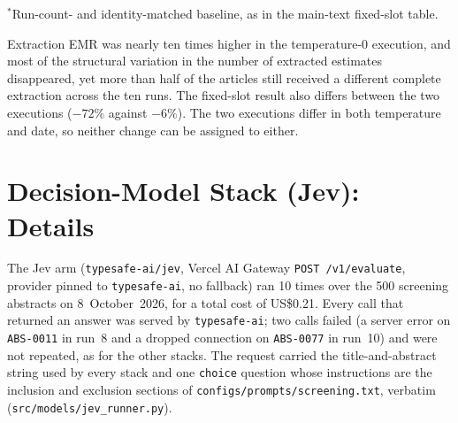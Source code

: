 \documentclass[11pt]{article}
\begin{document}
\noindent $^{*}$Run-count- and identity-matched baseline, as in the main-text fixed-slot table.

\noindent Extraction EMR was nearly ten times higher in the temperature-0 execution, and most of the structural variation in the number of extracted estimates disappeared, yet more than half of the articles still received a different complete extraction across the ten runs. The fixed-slot result also differs between the two executions ($-72\%$ against $-6\%$). The two executions differ in both temperature and date, so neither change can be assigned to either.

\section{Decision-Model Stack (Jev): Details}
\label{sec:jev_supp}

The Jev arm (\texttt{typesafe-ai/jev}, Vercel AI Gateway \texttt{POST /v1/evaluate}, provider pinned to \texttt{typesafe-ai}, no fallback) ran 10 times over the 500 screening abstracts on 8~October~2026, for a total cost of US\$0.21. Every call that returned an answer was served by \texttt{typesafe-ai}; two calls failed (a server error on \texttt{ABS-0011} in run~8 and a dropped connection on \texttt{ABS-0077} in run~10) and were not repeated, as for the other stacks. The request carried the title-and-abstract string used by every stack and one \texttt{choice} question whose instructions are the inclusion and exclusion sections of \texttt{configs/prompts/screening.txt}, verbatim (\texttt{src/models/jev\_runner.py}).
\end{document}

